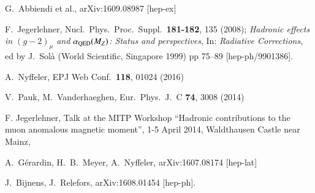 \documentclass[epj,onecolumn]{webofc}
\begin{document}
\begin{thebibliography}{}
  G.~Abbiendi et al.,
  arXiv:1609.08987 [hep-ex]

  F.~Jegerlehner,
  Nucl.\ Phys.\ Proc.\ Suppl.\  {\bf 181-182}, 135 (2008);
\textit{Hadronic effects in $(g - 2)_\mu$ and $\alpha_{\rm QED}(M_Z)$: Status and perspectives},
In: {\it Radiative Corrections},
 ed by J.~Sol\`a (World Scientific, Singapore 1999) pp 75--89
  [hep-ph/9901386].

  A.~Nyffeler,
  EPJ Web Conf.\  {\bf 118}, 01024 (2016)

  V.~Pauk, M.~Vanderhaeghen,
  Eur.\ Phys.\ J.\ C {\bf 74}, 3008 (2014)

F. Jegerlehner, Talk at the MITP Workshop
``Hadronic contributions to the muon anomalous magnetic moment'',
1-5 April 2014, Waldthausen Castle near Mainz,

  A.~G\'erardin, H.~B.~Meyer, A.~Nyffeler,
  arXiv:1607.08174 [hep-lat]

  J.~Bijnens, J.~Relefors,
  arXiv:1608.01454 [hep-ph].


\end{thebibliography}
\end{document}
